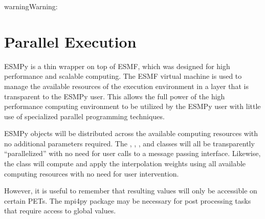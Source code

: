 \documentclass[letterpaper,10pt,english]{sphinxmanual}
\begin{document}
\begin{sphinxadmonition}{warning}{Warning:}
\begin{sphinxVerbatim}[commandchars=\\\{\}]
 \PYG{p}{[}\PYG{p}{]}    \PYG{p}{[}\PYG{p}{]} 

 \PYG{p}{[}\PYG{p}{]} 
\PYG{p}{[}\PYG{p}{]}   
\end{sphinxVerbatim}
\end{sphinxadmonition}


\section{Parallel Execution}
\label{\detokenize{api:parallel-execution}}
ESMPy is a thin wrapper on top of ESMF, which was designed for high performance
and scalable computing. The ESMF virtual machine is used to manage the available
resources of the execution environment in a layer that is transparent to the
ESMPy user. This allows the full power of the high performance computing
environment to be utilized by the ESMPy user with little use of specialized
parallel programming techniques.

ESMPy objects will be distributed across the available computing resources with
no additional parameters required. The {\hyperref[\detokenize{grid:ESMF.api.grid.Grid}]{}}, {\hyperref[\detokenize{mesh:ESMF.api.mesh.Mesh}]{}}, {\hyperref[\detokenize{locstream:ESMF.api.locstream.LocStream}]{}}, and {\hyperref[\detokenize{field:ESMF.api.field.Field}]{}} classes
will all be transparently “parallelized” with no need for user calls to a
message passing interface. Likewise, the {\hyperref[\detokenize{regrid:ESMF.api.regrid.Regrid}]{}} class will compute and apply
the interpolation weights using all available computing resources with no need
for user intervention.

However, it is useful to remember that resulting {\hyperref[\detokenize{field:ESMF.api.field.Field}]{}} values will only be
accessible on certain PETs. The mpi4py package may be necessary for post
processing tasks that require access to global {\hyperref[\detokenize{field:ESMF.api.field.Field}]{}} values.
\end{document}
